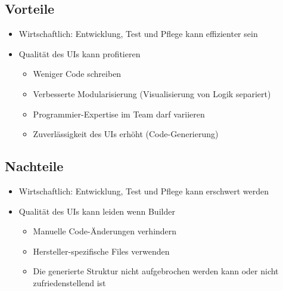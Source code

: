 \documentclass[a4paper,10pt]{article}
\begin{document}
\subsection{Vorteile}
\begin{itemize}
	\item Wirtschaftlich: Entwicklung, Test und Pflege kann effizienter sein
	\item Qualität des UIs kann profitieren
		\begin{itemize}
			\item Weniger Code schreiben
			\item Verbesserte Modularisierung (Visualisierung von Logik separiert)
			\item Programmier-Expertise im Team darf variieren
			\item Zuverl\"assigkeit des UIs erh\"oht (Code-Generierung)
		\end{itemize}
\end{itemize}
\subsection{Nachteile}
\begin{itemize}
	\item Wirtschaftlich: Entwicklung, Test und Pflege kann erschwert werden
	\item Qualit\"at des UIs kann leiden wenn Builder
		\begin{itemize}
			\item Manuelle Code-\"Anderungen verhindern
			\item Hersteller-spezifische Files verwenden
			\item Die generierte Struktur nicht aufgebrochen werden kann oder nicht zufriedenstellend ist
		\end{itemize}
\end{itemize}
\end{document}

